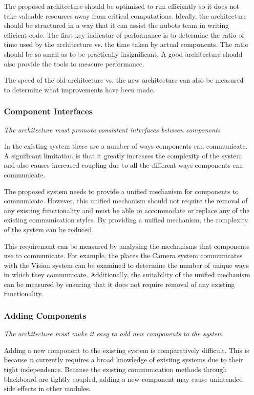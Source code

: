 \documentclass[english,12pt]{scrartcl}
\newcommand{\requirement}[1]{\textit{#1}}
\begin{document}
				The proposed architecture should be optimised to run efficiently so it does not take valuable resources away from critical computations.
				Ideally, the architecture should be structured in a way that it can assist the \gls{nubots} team in writing efficient code.
				The first key indicator of performance is to determine the ratio of time used by the architecture vs. the time taken by actual components.
				The ratio should be so small as to be practically insignificant. A good architecture should also provide the tools to measure performance.

				The speed of the old architecture vs. the new architecture can also be measured to determine what improvements have been made.

			\subsubsection{Component Interfaces}
				\requirement{The architecture must promote consistent interfaces between components}

				In the existing system there are a number of ways components can communicate.
				A significant limitation is that it greatly increases the complexity of the system and also causes increased coupling due to all the different ways components can communicate.

				The proposed system needs to provide a unified mechanism for components to communicate.
				However, this unified mechanism should not require the removal of any existing functionality and must be able to accommodate or replace any of the existing communication styles.
				By providing a unified mechanism, the complexity of the system can be reduced.

				This requirement can be measured by analysing the mechanisms that components use to communicate.
				For example, the places the Camera system communicates with the Vision system can be examined to determine the number of unique ways in which they communicate.
				Additionally, the suitability of the unified mechanism can be measured by ensuring that it does not require removal of any existing functionality.

			\subsubsection{Adding Components}
				\requirement{The architecture must make it easy to add new components to the system}

				Adding a new component to the existing system is comparatively difficult.
				This is because it currently requires a broad knowledge of existing systems due to their tight independence.
				Because the existing communication methods through blackboard are tightly coupled, adding a new component may cause unintended side effects in other modules.
\end{document}
